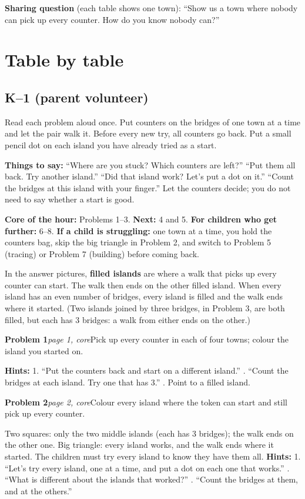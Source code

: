 \documentclass[10pt]{article}
\newcommand{\kprob}[3]{\par\needspace{14\baselineskip}\vspace{3pt}\noindent\textbf{#1}\enspace\textit{#2}\enspace #3\par}
\newcommand{\hints}[1]{\noindent\textbf{Hints:} #1\par}
\begin{document}
\textbf{Sharing question} (each table shows one town): ``Show us a town where nobody can pick up every counter. How do you know nobody can?''

\section{Table by table}

\subsection{K--1 (parent volunteer)}

Read each problem aloud once. Put counters on the bridges of one town at a time and let the pair walk it. Before every new try, all counters go back. Put a small pencil dot on each island you have already tried as a start.

\textbf{Things to say:} ``Where are you stuck? Which counters are left?'' \;``Put them all back. Try another island.'' \;``Did that island work? Let's put a dot on it.'' \;``Count the bridges at this island with your finger.'' Let the counters decide; you do not need to say whether a start is good.

\textbf{Core of the hour:} Problems 1--3. \textbf{Next:} 4 and 5. \textbf{For children who get further:} 6--8. \textbf{If a child is struggling:} one town at a time, you hold the counters bag, skip the big triangle in Problem 2, and switch to Problem 5 (tracing) or Problem 7 (building) before coming back.

In the answer pictures, \textbf{filled islands} are where a walk that picks up every counter can start. The walk then ends on the other filled island. When every island has an even number of bridges, every island is filled and the walk ends where it started. (Two islands joined by three bridges, in Problem 3, are both filled, but each has 3 bridges: a walk from either ends on the other.)

\kprob{Problem 1}{page 1, core}{Pick up every counter in each of four towns; colour the island you started on.}

\hints{1. ``Put the counters back and start on a different island.'' \;2. ``Count the bridges at each island. Try one that has 3.'' \;3. Point to a filled island.}

\kprob{Problem 2}{page 2, core}{Colour every island where the token can start and still pick up every counter.}

Two squares: only the two middle islands (each has 3 bridges); the walk ends on the other one. Big triangle: every island works, and the walk ends where it started. The children must try every island to know they have them all.
\hints{1. ``Let's try every island, one at a time, and put a dot on each one that works.'' \;2. ``What is different about the islands that worked?'' \;3. ``Count the bridges at them, and at the others.''}
\end{document}
